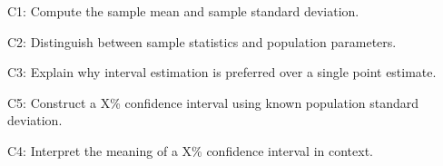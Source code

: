 

	
	\begin{ExamCriteria}
		\item C1: Compute the sample mean and sample standard deviation.
		\item C2: Distinguish between sample statistics and population parameters.
		\item C3: Explain why interval estimation is preferred over a single point estimate.
		\item C5: Construct a X\% confidence interval using known population standard deviation.
		\item C4: Interpret the meaning of a X\% confidence interval in context.
	\end{ExamCriteria}
	
